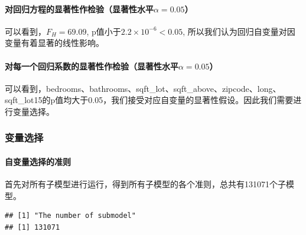 \documentclass[]{article}
\let\oldparagraph\paragraph
\renewcommand{\paragraph}[1]{\oldparagraph{#1}\mbox{}}
\begin{document}
\paragraph{\texorpdfstring{对回归方程的显著性作检验（显著性水平\(\alpha = 0.05\)）}{对回归方程的显著性作检验（显著性水平\textbackslash{}alpha = 0.05）}}\label{alpha-0.05}

可以看到，\(F_H = 69.09\), p值小于\(2.2\times 10 ^{-6} < 0.05\),
所以我们认为回归自变量对因变量有着显著的线性影响。

\paragraph{\texorpdfstring{对每一个回归系数的显著性作检验（显著性水平\(\alpha = 0.05\)）}{对每一个回归系数的显著性作检验（显著性水平\textbackslash{}alpha = 0.05）}}\label{alpha-0.05}

可以看到，bedrooms、bathrooms、sqft\_lot、sqft\_above、zipcode、long、sqft\_lot15的p值均大于0.05，我们接受对应自变量的显著性假设。因此我们需要进行变量选择。

\subsubsection{变量选择}

\paragraph{自变量选择的准则}

首先对所有子模型进行运行，得到所有子模型的各个准则，总共有131071个子模型。
\begin{verbatim}
## [1] "The number of submodel"
## [1] 131071
\end{verbatim}
\end{document}
